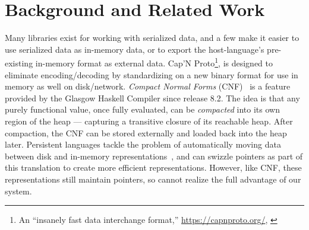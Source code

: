 \documentclass[showabstract,showacknowledgments,showpreface,showdedication]{iuphd}
\theoremstyle{nonumberplain}
\newcommand{\il}[1]{\lstinline[style=inline,mathescape=true];#1;}
\begin{document}
\section{Background and Related Work}\label{sec:bg}

Many libraries exist for working with serialized data, and a few
make it easier to use serialized data as in-memory data, or to export the
host-language's pre-existing in-memory format as external data.
Cap'N Proto\footnote{An ``insanely fast data interchange format,''
  \url{https://capnproto.org/}, \cite{capnproto}},
is designed to eliminate encoding/decoding by
standardizing on a new binary format for use in memory as well on disk/network.
%
%
{\em Compact Normal Forms} (CNF)~\cite{cnf-icfp15} is 
a feature provided by the Glasgow Haskell Compiler since release 8.2.  
%
%
The idea is that any purely functional value, once fully evaluated, can be {\em compacted}
into its own region of the heap
--- capturing a transitive closure of its reachable heap.
After compaction, the CNF can be stored externally and loaded
back into the heap later.
%
{Persistent languages tackle the problem of automatically moving data between disk 
and in-memory representations~\cite{persistent-java,persistent-object-systems,persistent-objects-thor}, and can swizzle pointers as part of this 
translation to create more efficient representations. However, like CNF, these 
representations still maintain pointers, so cannot realize the full advantage of 
our system.}
\end{document}
